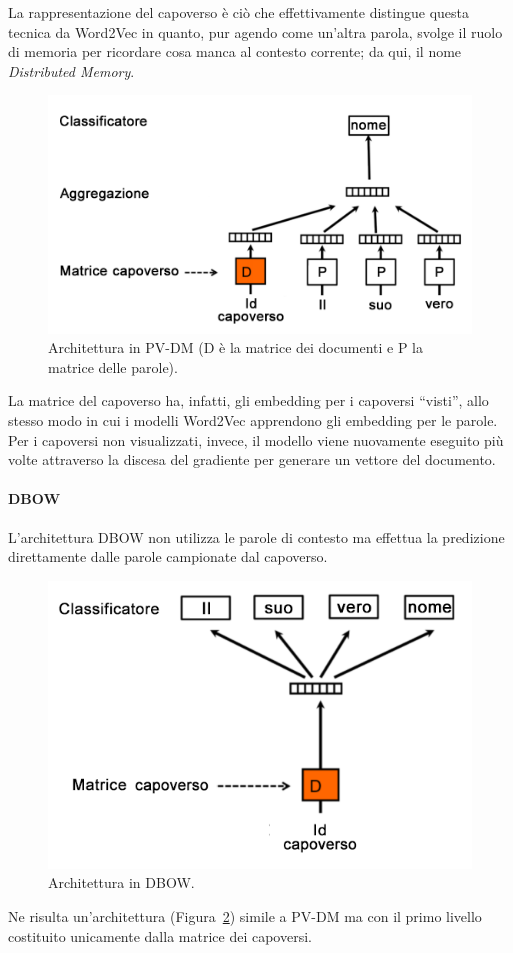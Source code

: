 \documentclass[12pt]{report}
\theoremstyle{definition}
\begin{document}
La rappresentazione del capoverso è ciò che effettivamente distingue questa tecnica da Word2Vec in quanto, pur agendo come un'altra parola, svolge il ruolo di memoria per ricordare cosa manca al contesto corrente; da qui, il nome \textit{Distributed Memory}.
\begin{figure}
    \centering
    \includegraphics[scale = 0.3]{images/pvdm.png}
    \caption{Architettura in PV-DM (D è la matrice dei documenti e P la matrice delle parole).}
    \label{pvdm}
\end{figure}
La matrice del capoverso ha, infatti, gli embedding per i capoversi ``visti'', allo stesso modo in cui i modelli Word2Vec apprendono gli embedding per le parole. Per i capoversi non visualizzati, invece, il modello viene nuovamente eseguito più volte attraverso la discesa del gradiente per generare un vettore del documento. 

\paragraph{DBOW}
L'architettura DBOW non utilizza le parole di contesto ma effettua la predizione direttamente dalle parole campionate dal capoverso.
\begin{figure}
    \centering
    \includegraphics[scale = 0.45]{images/dbow.png}
    \caption{Architettura in DBOW.}
    \label{dbow}
\end{figure}
Ne risulta un'architettura (Figura~\ref{dbow}) simile a PV-DM ma con il primo livello costituito unicamente dalla matrice dei capoversi.
\end{document}
